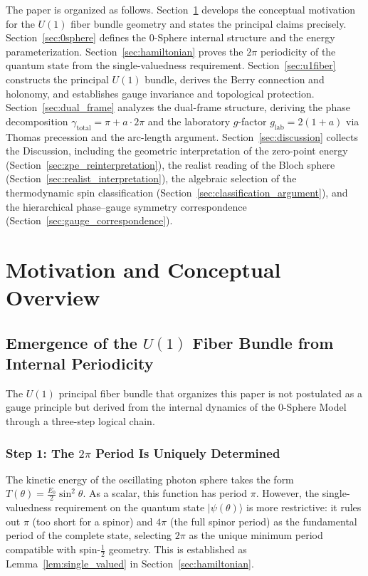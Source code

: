 \documentclass[%
 reprint,
 amsmath,amssymb,
 aps,
 prb,
]{revtex4-2}
\numberwithin{equation}{section}
\theoremstyle{definition}
\theoremstyle{remark}
\newcommand{\Uone}{U(1)}
\begin{document}
The paper is organized as follows. Section~\ref{sec:motivation} develops the conceptual motivation for the $\Uone$ fiber bundle geometry and states the principal claims precisely. Section~\ref{sec:0sphere} defines the 0-Sphere internal structure and the energy parameterization. Section~\ref{sec:hamiltonian} proves the $2\pi$ periodicity of the quantum state from the single-valuedness requirement. Section~\ref{sec:u1fiber} constructs the principal $\Uone$ bundle, derives the Berry connection and holonomy, and establishes gauge invariance and topological protection. Section~\ref{sec:dual_frame} analyzes the dual-frame structure, deriving the phase decomposition $\gamma_{\text{total}} = \pi + a \cdot 2\pi$ and the laboratory $g$-factor $g_{\text{lab}} = 2(1+a)$ via Thomas precession and the arc-length argument. Section~\ref{sec:discussion} collects the Discussion, including the geometric interpretation of the zero-point energy (Section~\ref{sec:zpe_reinterpretation}), the realist reading of the Bloch sphere (Section~\ref{sec:realist_interpretation}), the algebraic selection of the thermodynamic spin classification (Section~\ref{sec:classification_argument}), and the hierarchical phase--gauge symmetry correspondence (Section~\ref{sec:gauge_correspondence}).

\section{Motivation and Conceptual Overview}
\label{sec:motivation}

\subsection{Emergence of the \texorpdfstring{$\Uone$}{U(1)} Fiber Bundle from Internal Periodicity}
\label{sec:why_u1}

The $\Uone$ principal fiber bundle that organizes this paper is not postulated as a gauge principle but derived from the internal dynamics of the 0-Sphere Model through a three-step logical chain.

\subsubsection{Step 1: The $2\pi$ Period Is Uniquely Determined}

The kinetic energy of the oscillating photon sphere takes the form $T(\theta) = \frac{E_0}{2}\sin^2\theta$. As a scalar, this function has period $\pi$. However, the single-valuedness requirement on the quantum state $|\psi(\theta)\rangle$ is more restrictive: it rules out $\pi$ (too short for a spinor) and $4\pi$ (the full spinor period) as the fundamental period of the complete state, selecting $2\pi$ as the unique minimum period compatible with spin-$\tfrac{1}{2}$ geometry. This is established as Lemma~\ref{lem:single_valued} in Section~\ref{sec:hamiltonian}.
\end{document}
